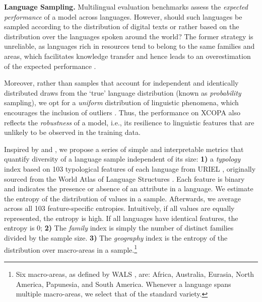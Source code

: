 \documentclass[11pt,a4paper]{article}
\begin{document}
\vspace{1.4mm}
\noindent \textbf{Language Sampling.}
\label{ss:languagesampling}
Multilingual evaluation benchmarks assess the \textit{expected performance} of a model across languages. However, should such languages be sampled according to the distribution of digital texts or rather based on the distribution over the languages spoken around the world? The former strategy is unreliable, as languages rich in resources tend to belong to the same families and areas, which facilitates knowledge transfer and hence leads to an overestimation of the expected performance \citep{gerz-etal-2018-relation,Ponti:2019cl}. 

Moreover, rather than samples that account for independent and identically distributed draws from the `true' language distribution (known as \textit{probability} sampling), we opt for a \textit{uniform} distribution of linguistic phenomena, which encourages the inclusion of outliers \citep[known as \textit{variety} sampling;][]{rijkhoff1993method,dryer1989large}. Thus, the performance on XCOPA also reflects the \textit{robustness} of a model, i.e., its resilience to linguistic features that are unlikely to be observed in the training data.











Inspired by \citet{rijkhoff1993method} and \citet{miestamo2004clausal}, we propose a series of simple and interpretable metrics that quantify diversity of a language sample independent of its size: \textbf{1)} a \textit{typology} index based on 103 typological features of each language from URIEL \cite{Littel-et-al:2017}, originally sourced from the World Atlas of Language Structures \citep[WALS;][]{wals}. Each feature is binary and indicates the presence or absence of an attribute in a language. We estimate the entropy of the distribution of values in a sample. Afterwards, we average across all 103 feature-specific entropies. Intuitively, if all values are equally represented, the entropy is high. If all languages have identical features, the entropy is 0; \textbf{2)} The \textit{family} index is simply the number of distinct families divided by the sample size. \textbf{3)} The \textit{geography} index is the entropy of the distribution over macro-areas in a sample.\footnote{Six macro-areas, as defined by WALS \cite{wals}, are: Africa, Australia, Eurasia, North America, Papunesia, and South America. Whenever a language spans multiple macro-areas, we select that of the standard variety.}
\end{document}
